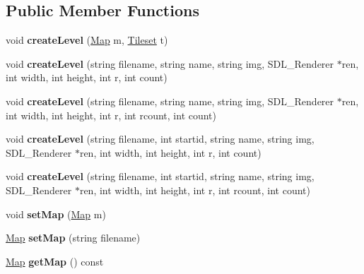\subsection*{Public Member Functions}
\begin{DoxyCompactItemize}
\item 
void {\bfseries create\+Level} (\hyperlink{classMap}{Map} m, \hyperlink{classTileset}{Tileset} t)\hypertarget{classLevel_a864fb9f328b7cf5be2a39e858e9681f5}{}\label{classLevel_a864fb9f328b7cf5be2a39e858e9681f5}

\item 
void {\bfseries create\+Level} (string filename, string name, string img, S\+D\+L\+\_\+\+Renderer $\ast$ren, int width, int height, int r, int count)\hypertarget{classLevel_a6346afdfc5eba1ce98254d5cdb39776d}{}\label{classLevel_a6346afdfc5eba1ce98254d5cdb39776d}

\item 
void {\bfseries create\+Level} (string filename, string name, string img, S\+D\+L\+\_\+\+Renderer $\ast$ren, int width, int height, int r, int rcount, int count)\hypertarget{classLevel_aaa9e17c51ed13c6a2b11ff04e3e4d81e}{}\label{classLevel_aaa9e17c51ed13c6a2b11ff04e3e4d81e}

\item 
void {\bfseries create\+Level} (string filename, int startid, string name, string img, S\+D\+L\+\_\+\+Renderer $\ast$ren, int width, int height, int r, int count)\hypertarget{classLevel_a698588721ec86ea8bc1002b58543ac14}{}\label{classLevel_a698588721ec86ea8bc1002b58543ac14}

\item 
void {\bfseries create\+Level} (string filename, int startid, string name, string img, S\+D\+L\+\_\+\+Renderer $\ast$ren, int width, int height, int r, int rcount, int count)\hypertarget{classLevel_af9b3321b7dff0ba6077ac43e9d49756d}{}\label{classLevel_af9b3321b7dff0ba6077ac43e9d49756d}

\item 
void {\bfseries set\+Map} (\hyperlink{classMap}{Map} m)\hypertarget{classLevel_a825b41113f6da7e1294f42f463f98a4c}{}\label{classLevel_a825b41113f6da7e1294f42f463f98a4c}

\item 
\hyperlink{classMap}{Map} {\bfseries set\+Map} (string filename)\hypertarget{classLevel_a97b3a35b145204905ad4bdb4c19e36c7}{}\label{classLevel_a97b3a35b145204905ad4bdb4c19e36c7}

\item 
\hyperlink{classMap}{Map} {\bfseries get\+Map} () const \hypertarget{classLevel_ae40b6bfd8916e65cbcd10790702b1782}{}\label{classLevel_ae40b6bfd8916e65cbcd10790702b1782}


\end{DoxyCompactItemize}
